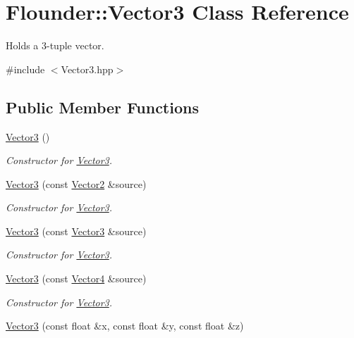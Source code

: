 \hypertarget{class_flounder_1_1_vector3}{}\section{Flounder\+:\+:Vector3 Class Reference}
\label{class_flounder_1_1_vector3}


Holds a 3-\/tuple vector.  




{\ttfamily \#include $<$Vector3.\+hpp$>$}

\subsection*{Public Member Functions}
\begin{DoxyCompactItemize}
\item 
\hyperlink{class_flounder_1_1_vector3_a7e2f110745a058410ab80bbdbff4adce}{Vector3} ()
\begin{DoxyCompactList}\small\item\em Constructor for \hyperlink{class_flounder_1_1_vector3}{Vector3}. \end{DoxyCompactList}\item 
\hyperlink{class_flounder_1_1_vector3_adc360c97ea45b35edd49801c0859bb45}{Vector3} (const \hyperlink{class_flounder_1_1_vector2}{Vector2} \&source)
\begin{DoxyCompactList}\small\item\em Constructor for \hyperlink{class_flounder_1_1_vector3}{Vector3}. \end{DoxyCompactList}\item 
\hyperlink{class_flounder_1_1_vector3_a67f3be4dfd3f0021b1a58e9fe41863cd}{Vector3} (const \hyperlink{class_flounder_1_1_vector3}{Vector3} \&source)
\begin{DoxyCompactList}\small\item\em Constructor for \hyperlink{class_flounder_1_1_vector3}{Vector3}. \end{DoxyCompactList}\item 
\hyperlink{class_flounder_1_1_vector3_a210b1c815bbec1cf02263e224f0c3732}{Vector3} (const \hyperlink{class_flounder_1_1_vector4}{Vector4} \&source)
\begin{DoxyCompactList}\small\item\em Constructor for \hyperlink{class_flounder_1_1_vector3}{Vector3}. \end{DoxyCompactList}\item 
\hyperlink{class_flounder_1_1_vector3_a4fb6857c48f2c1d68a3fcae74c2c8636}{Vector3} (const float \&x, const float \&y, const float \&z)

\end{DoxyCompactItemize}
